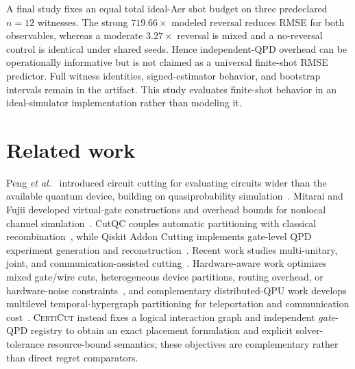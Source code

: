 \documentclass[
  aps,
  pra,
  reprint,
  amsmath,
  amssymb,
  longbibliography,
  nofootinbib,
  floatfix
]{revtex4-2}
\theoremstyle{plain}
\newcommand{\CertiCut}{\textsc{CertiCut}}
\begin{document}
A final study fixes an equal total ideal-Aer shot budget on three predeclared $n=12$ witnesses. The strong $719.66\times$ modeled reversal reduces RMSE for both observables, whereas a moderate $3.27\times$ reversal is mixed and a no-reversal control is identical under shared seeds. Hence independent-QPD overhead can be operationally informative but is not claimed as a universal finite-shot RMSE predictor. Full witness identities, signed-estimator behavior, and bootstrap intervals remain in the artifact. This study evaluates finite-shot behavior in an ideal-simulator implementation rather than modeling it.

\section{Related work}
\label{sec:related}

Peng \emph{et al.}~\cite{peng2020} introduced circuit cutting for evaluating circuits wider than the available quantum device, building on quasiprobability simulation~\cite{bravyi2016}. Mitarai and Fujii developed virtual-gate constructions and overhead bounds for nonlocal channel simulation~\cite{mitarai2021,mitarai2021overhead}. CutQC couples automatic partitioning with classical recombination~\cite{tang2021}, while Qiskit Addon Cutting implements gate-level QPD experiment generation and reconstruction~\cite{qiskitcutting}. Recent work studies multi-unitary, joint, and communication-assisted cutting~\cite{schmitt2025,piveteau2022,ufrecht2024,ufrecht2023,piveteau2024,piveteau2025sideinfo,brenner2025,lowe2023,li2024,shotqc2024,golden2023,gentinetta2024,carrera2024,harrowlowe2025}. Hardware-aware work optimizes mixed gate/wire cuts, heterogeneous device partitions, routing overhead, or hardware-noise constraints~\cite{mosaiqc2026,tw2s2026,pal2026noise}, and complementary distributed-QPU work develops multilevel temporal-hypergraph partitioning for teleportation and communication cost~\cite{burt2026}. \CertiCut{} instead fixes a logical interaction graph and independent \emph{gate}-QPD registry to obtain an exact placement formulation and explicit solver-tolerance resource-bound semantics; these objectives are complementary rather than direct regret comparators.
\end{document}
